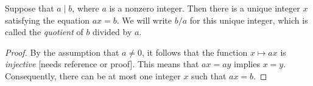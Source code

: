 
\begin{lemma}
  Suppose that $a\mid b$, where $a$ is a nonzero integer. Then there is a unique integer $x$ satisfying the equation $ax=b$. We will write $b/a$ for this unique integer, which is called the \emph{quotient} of $b$ divided by $a$.
\end{lemma}

\begin{proof}
%
  By the assumption that $a\neq 0$, it follows that the function $x\mapsto ax$ is \emph{injective} {\color{Red} [needs reference or proof]}. This means that $ax=ay$ implies $x=y$. Consequently, there can be at most one integer $x$ such that $ax=b$.
\end{proof}

